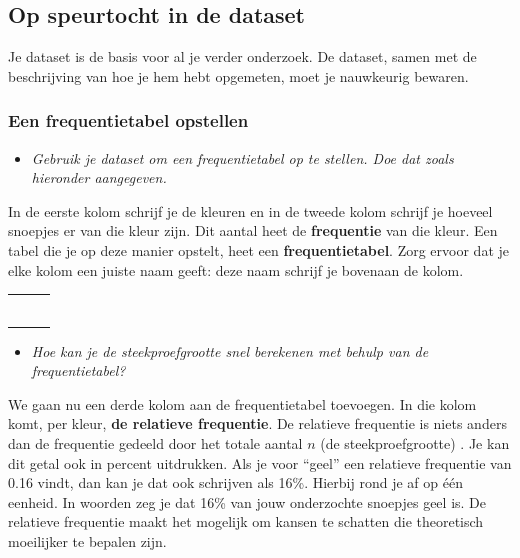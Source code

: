 \documentclass[11pt]{article}
\newcommand{\vraag}[2]{\begin{itemize}\item {\it #1} \vspace*{#2}\end{itemize}}
\begin{document}
\subsection{Op speurtocht in de dataset}

Je dataset is de basis voor al je verder onderzoek. De dataset, samen met de beschrijving van hoe je
hem hebt opgemeten, moet je nauwkeurig bewaren.

\subsubsection{Een frequentietabel opstellen}

\vraag{Gebruik je dataset om een frequentietabel op te stellen. Doe dat zoals hieronder aangegeven.}{0cm}

In de eerste kolom schrijf je de kleuren en in de tweede kolom schrijf je hoeveel snoepjes er van die
kleur zijn. Dit aantal heet de {\bf frequentie} van die kleur. Een tabel die je op deze manier opstelt, heet
een {\bf frequentietabel}. Zorg ervoor dat je elke kolom een juiste naam geeft: deze naam schrijf je
bovenaan de kolom.

\begin{center}
  \begin{tabular}{|p{2cm}|p{2cm}|p{2cm}|}
    \hline
    &&\vspace*{0pt}\\
    \hline
    &&\vspace*{0pt}\\
    \hline
    &&\vspace*{0pt}\\
    \hline
    &&\vspace*{0pt}\\
    \hline
    &&\vspace*{0pt}\\
    \hline
    &&\vspace*{0pt}\\
    \hline
    &&\vspace*{0pt}\\
    \hline
  \end{tabular}
\end{center}
\vspace{1cm}

\vraag{Hoe kan je de steekproefgrootte snel berekenen met behulp van de frequentietabel?}{4cm}

We gaan nu een derde kolom aan de frequentietabel toevoegen. In die kolom komt, per kleur, {\bf de
relatieve frequentie}. De relatieve frequentie is niets anders dan de frequentie gedeeld door het totale
aantal $n$ (de steekproefgrootte) . Je kan dit getal ook in percent uitdrukken. Als je voor “geel” een relatieve frequentie van
0.16 vindt, dan kan je dat ook schrijven als 16\%. Hierbij rond je af op één eenheid. In woorden zeg
je dat 16\% van jouw onderzochte snoepjes geel is. De relatieve frequentie maakt het mogelijk om kansen
te schatten die theoretisch moeilijker te bepalen zijn.
\end{document}
